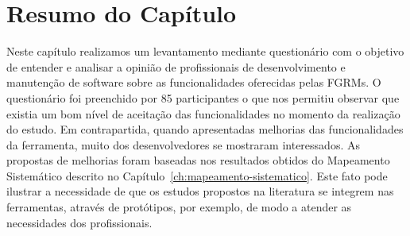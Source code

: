 \section{Resumo do Capítulo}
\label{sec:resumo_do_capitulo}

Neste capítulo realizamos um levantamento mediante questionário com o objetivo
de entender e analisar a opinião de profissionais de desenvolvimento e
manutenção de software sobre as funcionalidades oferecidas pelas FGRMs. O
questionário foi preenchido por 85 participantes o que nos permitiu observar que
existia um bom nível de aceitação das funcionalidades no momento da realização
do estudo. Em contrapartida, quando apresentadas melhorias das funcionalidades
da ferramenta, muito dos desenvolvedores se mostraram interessados. As propostas
de melhorias foram baseadas nos resultados obtidos do Mapeamento Sistemático
descrito no Capítulo~\ref{ch:mapeamento-sistematico}. Este fato pode ilustrar a
necessidade de que os estudos propostos na literatura se integrem nas
ferramentas, através de protótipos, por exemplo, de modo a atender as
necessidades dos profissionais.
